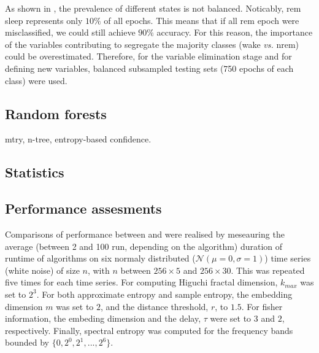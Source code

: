 As shown in , the prevalence of different states is not balanced. Noticably, \gls{rem} sleep represents only $10\%$ of all epochs.
This means that if all \gls{rem} epoch were misclassified, we could still achieve $90\%$ accuracy.
For this reason, the importance of the variables contributing to segregate the majority classes (wake \emph{vs.} \gls{nrem}) could be overestimated.
Therefore, for the variable elimination stage and for defining new variables,
balanced subsampled testing sets (750 epochs of each class) were used.




\subsection{Random forests}
mtry, n-tree, entropy-based confidence.
\subsection{Statistics}

\subsection{Performance assesments}
Comparisons of performance between \pr{} and \pyeeg{} were realised by meseauring the average (between 2 and 100 run, depending on the algorithm) duration of runtime of algorithms on six
normaly distributed ($\mathcal{N}(\mu=0,\sigma=1)$) time series (\ie white noise) of size $n$,
with $n$ between $256 \times{} 5$ and $256 \times{} 30$.
This was repeated five times for each time series.
For computing  Higuchi fractal dimension, $k_{max}$ was set to $2^3$.
For both approximate entropy and sample entropy, the embedding dimension $m$ was set to $2$, and the distance threshold, $r$, to $1.5$.
For fisher information, the embeding dimension and the delay, $\tau$ were set to $3$ and $2$, respectively.
Finally, spectral entropy was computed for the frequency bands bounded by $\{0, 2^0, 2^1, ..., 2^6\}$.



